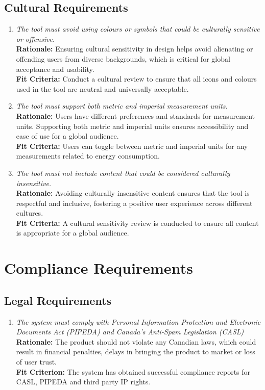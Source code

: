 \documentclass[12pt]{article}
\begin{document}
\subsection{Cultural Requirements}
\begin{enumerate}[label=CULT \arabic*., wide=0pt, leftmargin=*]
  \item \emph{The tool must avoid using colours or symbols that could be culturally sensitive or offensive.}\\
  {\bf Rationale:} Ensuring cultural sensitivity in design helps avoid alienating or offending users from diverse backgrounds, which is critical for global acceptance and usability.\\
  {\bf Fit Criteria:} Conduct a cultural review to ensure that all icons and colours used in the tool are neutral and universally acceptable.
  
  \item \emph{The tool must support both metric and imperial measurement units.}\\
  {\bf Rationale:} Users have different preferences and standards for measurement units. Supporting both metric and imperial units ensures accessibility and ease of use for a global audience.\\
  {\bf Fit Criteria:} Users can toggle between metric and imperial units for any measurements related to energy consumption.
  
  \item \emph{The tool must not include content that could be considered culturally insensitive.}\\
  {\bf Rationale:} Avoiding culturally insensitive content ensures that the tool is respectful and inclusive, fostering a positive user experience across different cultures.\\
  {\bf Fit Criteria:} A cultural sensitivity review is conducted to ensure all content is appropriate for a global audience.
\end{enumerate}

\section{Compliance Requirements}
\subsection{Legal Requirements}
\begin{enumerate}[label=CR-LR \arabic*., wide=0pt, leftmargin=*]
	\item \emph{The system must comply with Personal Information Protection and Electronic Documents Act (PIPEDA) and Canada’s Anti-Spam Legislation (CASL)}\\[2mm]
    {\bf Rationale:} The product should not violate any Canadian laws, which could result in  financial penalties, delays in bringing the product to market or loss of user trust.\\
    {\bf Fit Criterion:} The system has obtained successful compliance reports for CASL, PIPEDA and third party IP rights.
\end{enumerate}
\end{document}
